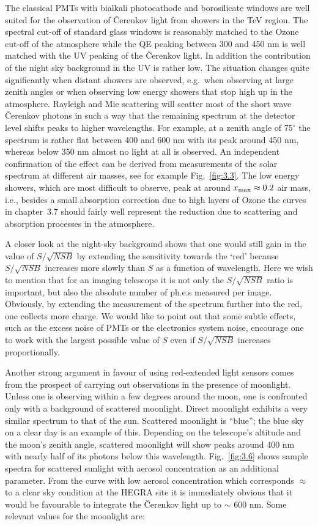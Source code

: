 The classical PMTs with bialkali photocathode and borosilicate windows are
well suited for the observation of \v{C}erenkov light from showers in the TeV
region. The spectral cut-off of standard glass windows is reasonably matched to
the Ozone cut-off of the atmosphere while the QE peaking between 300 and 450
nm is well matched with the UV peaking of the \v{C}erenkov light. In addition
the contribution of the night sky background in the UV is rather low. The
situation changes quite significantly when distant showers are observed,
e.g.\ when observing at large zenith angles or when observing low energy
showers that stop high up in the atmosphere. Rayleigh and Mie scattering
will scatter most of the short wave \v{C}erenkov photons in such a way that the
remaining spectrum at the detector level shifts peaks to higher wavelengths.
For example, at a zenith angle of 75$^\circ$ the spectrum is rather flat
between 400 and 600 nm with its peak around 450 nm, whereas below 350 nm
almost no light at all is observed. 
An independent confirmation of the
effect can be derived from measurements of the solar spectrum at different
air masses, see for example Fig.~\ref{fig:3.3}. The low energy showers, 
which are most
difficult to observe, peak at around $x_{{\rm max}} \approx 0.2$ air mass,
i.e., besides a small absorption correction due to high layers of Ozone
the curves in chapter~3.7 should fairly well represent the
reduction due to scattering and absorption processes in the atmosphere.

A closer look at the night-sky background shows that one would still gain in
the value of $S/\sqrt{NSB}$ by extending the sensitivity towards the `red'
because $S/\sqrt{NSB}$ increases more slowly than $S$ as a function of
wavelength. 
Here we wish to mention that for an imaging telescope it is not only
the $S/\sqrt{NSB}$ ratio is important, but also the absolute number of
ph.e.s measured per image. Obviously, by extending the measurement of the
\Cerenkov spectrum further into the red, one collects more charge. 
We would like to point out that some subtle effects, such as the
excess noise of PMTs or the electronics system noise, encourage one to work
with the largest possible value of $S$ even if $S/\sqrt{NSB}$ increases
proportionally.

Another strong argument in favour of using red-extended light sensors comes
from the prospect of carrying out observations in the presence of moonlight.
Unless one is observing within a few degrees around the moon, one is
confronted only with a background of scattered moonlight. Direct moonlight
exhibits a very similar spectrum to that of the sun. Scattered moonlight is
``blue''; the blue sky on a clear day is an example of this. Depending on
the telescope's altitude and the moon's zenith angle, scattered moonlight
will show peaks around 400 nm with nearly half of its photons below this
wavelength. Fig.~\ref{fig:3.6} shows sample spectra for scattered sunlight with
aerosol concentration as an additional parameter. From the curve with low
aerosol concentration which corresponds $\approx$ to a clear sky condition
at the HEGRA site
it is immediately obvious that it would be favourable
to integrate the \v{C}erenkov light up to $\sim $ 600 nm. Some relevant values
for the moonlight are:


